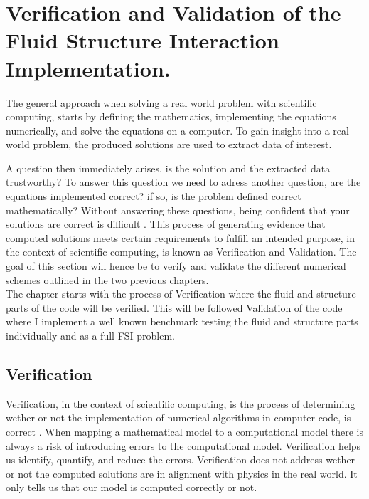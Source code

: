 \chapter{Verification and Validation of the Fluid Structure Interaction Implementation.}\label{chap:VV}
The general approach when solving a real world problem with scientific computing, starts by defining the mathematics, implementing the equations numerically, and solve the equations on a computer. To gain insight into a real world problem, the produced solutions are used to extract data of interest.

A question then immediately arises, is the solution and the extracted data trustworthy?
To answer this question we need to adress another question, are the equations implemented correct? if so, is the problem defined correct mathematically?
Without answering these questions, being confident that your solutions are correct is difficult \cite{Selin2014}. This process of generating evidence that computed solutions meets certain requirements to fulfill an intended purpose, in the context of scientific computing, is known as Verification and Validation. The goal of this section will hence be to verify and validate the different numerical schemes outlined in the two previous chapters.  \\

The chapter starts with the process of Verification where the fluid and structure parts of the code will be verified. This will be followed Validation of the code where I implement a well known benchmark testing the fluid and structure parts individually and as a full FSI problem. \newline

\section{Verification}
Verification, in the context of scientific computing, is the process of determining wether or not the implementation of numerical algorithms in computer code, is correct \cite{Oberkampf2010}.
When mapping a mathematical model to a computational model there is always a risk of introducing errors to the computational model. Verification helps us identify, quantify, and reduce the errors. Verification does not address wether or not the computed solutions are in alignment with physics in the real world. It only tells us that our model is computed correctly or not. \newline

